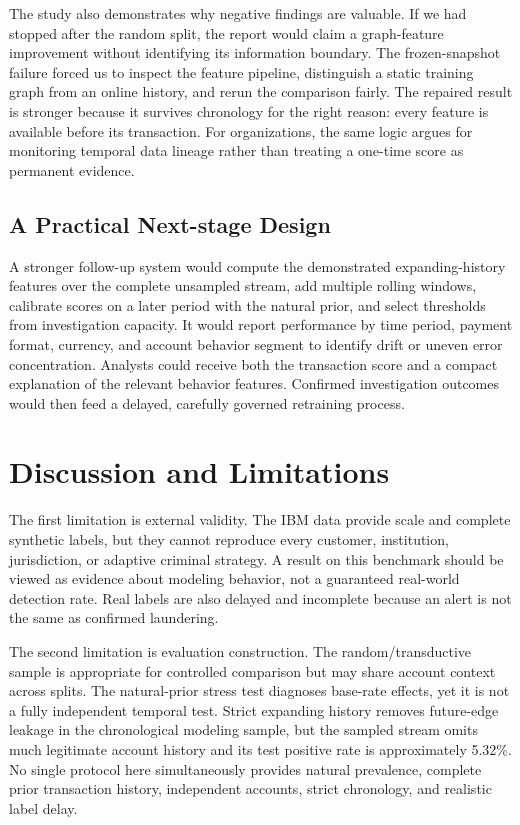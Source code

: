 \documentclass{article}
\begin{document}
The study also demonstrates why negative findings are valuable. If we had stopped after the random split, the report would claim a graph-feature improvement without identifying its information boundary. The frozen-snapshot failure forced us to inspect the feature pipeline, distinguish a static training graph from an online history, and rerun the comparison fairly. The repaired result is stronger because it survives chronology for the right reason: every feature is available before its transaction. For organizations, the same logic argues for monitoring temporal data lineage rather than treating a one-time score as permanent evidence.

\subsection{A Practical Next-stage Design}
A stronger follow-up system would compute the demonstrated expanding-history features over the complete unsampled stream, add multiple rolling windows, calibrate scores on a later period with the natural prior, and select thresholds from investigation capacity. It would report performance by time period, payment format, currency, and account behavior segment to identify drift or uneven error concentration. Analysts could receive both the transaction score and a compact explanation of the relevant behavior features. Confirmed investigation outcomes would then feed a delayed, carefully governed retraining process.

\section{Discussion and Limitations}
The first limitation is external validity. The IBM data provide scale and complete synthetic labels, but they cannot reproduce every customer, institution, jurisdiction, or adaptive criminal strategy. A result on this benchmark should be viewed as evidence about modeling behavior, not a guaranteed real-world detection rate. Real labels are also delayed and incomplete because an alert is not the same as confirmed laundering.

The second limitation is evaluation construction. The random/transductive sample is appropriate for controlled comparison but may share account context across splits. The natural-prior stress test diagnoses base-rate effects, yet it is not a fully independent temporal test. Strict expanding history removes future-edge leakage in the chronological modeling sample, but the sampled stream omits much legitimate account history and its test positive rate is approximately 5.32\%. No single protocol here simultaneously provides natural prevalence, complete prior transaction history, independent accounts, strict chronology, and realistic label delay.
\end{document}
